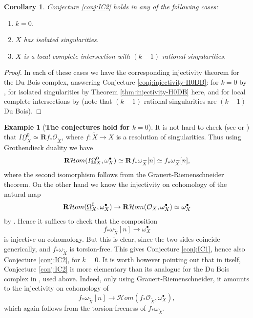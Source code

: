 \documentclass[11pt]{amsart}
\newtheorem{corollary}[equation]{Corollary}
\theoremstyle{definition}
\newtheorem{example}[equation]{Example}
\theoremstyle{plain}
\renewcommand{\H}{\mathcal H}
\renewcommand{\O}{\mathcal O}
\newcommand{\derR}{\mathbf R}
\newcommand{\RHom}{{\bf R} \H om}
\newcommand{\DB}{\underline{\Omega}} %
\begin{document}
\begin{corollary}\label{cor:conj-IC}
Conjecture \ref{conj:IC2} holds in any of the following cases:
\begin{enumerate}
\item $k =0$.
\item $X$ has isolated singularities.
\item $X$ is a local complete intersection with $(k-1)$-rational singularities.
\end{enumerate}
\end{corollary}
\begin{proof}
In each of these cases we have the corresponding injectivity theorem for the Du Bois complex, answering Conjecture \ref{conj:injectivity-H0DB}:
for $k = 0$ by \cite{KS-injectivity}, for isolated singularities by Theorem \ref{thm:injectivity-H0DB} here, and for local complete intersections by \cite{MP-lci} (note that 
$(k-1)$-rational singularities are $(k-1)$-Du Bois).
\end{proof}


\iffalse

\begin{example}[{\bf The conjectures hold for $k= 0$}]\label{ex:k=0}
It is not hard to check (see \cite{Saito-MHC} or \cite[Proposition 8.2]{KS-extending})  that $I\DB^0_X \simeq \derR f_* \O_{\widetilde X}$, where $f \colon {\widetilde X} \to X $ is a resolution of singularities. Thus using Grothendieck duality we have
$$\RHom(I\DB_X^0,\omega_X^{\bullet}) \simeq \derR f_* \omega_{\widetilde X} [n] \simeq  f_* \omega_{\widetilde X} [n],$$
where the second isomorphism follows from the Grauert-Riemenschneider theorem.
On the other hand we know the injectivity on cohomology of the natural map
$$\RHom(\DB_X^0,\omega_X^{\bullet}) \to \RHom(\O_X,\omega_X^{\bullet}) \simeq \omega_X^{\bullet}$$
by \cite[Theorem 3.3]{KS-injectivity}. Hence it suffices to check that the composition 
$$f_* \omega_{\widetilde X} [n] \to \omega_X^{\bullet}$$ 
is injective on cohomology. But this is clear, since the two sides coincide generically, and $f_* \omega_{\widetilde X}$ is torsion-free.
This gives Conjecture \ref{conj:IC1}, hence also Conjecture \ref{conj:IC2}, for $k = 0$. 
It is worth however pointing out that in itself, Conjecture \ref{conj:IC2} is more elementary than its analogue for the Du Bois complex in \cite{KS-injectivity}, used above. Indeed, only using Grauert-Riemenschneider, it amounts to the injectivity on cohomology of 
$$f_* \omega_{\widetilde X} [n] \to \mathcal{H}om (f_* \O_{\widetilde X}, \omega_X^{\bullet}),$$
which again follows from the torsion-freeness of  $f_* \omega_{\widetilde X}$.
\end{example}
\end{document}
